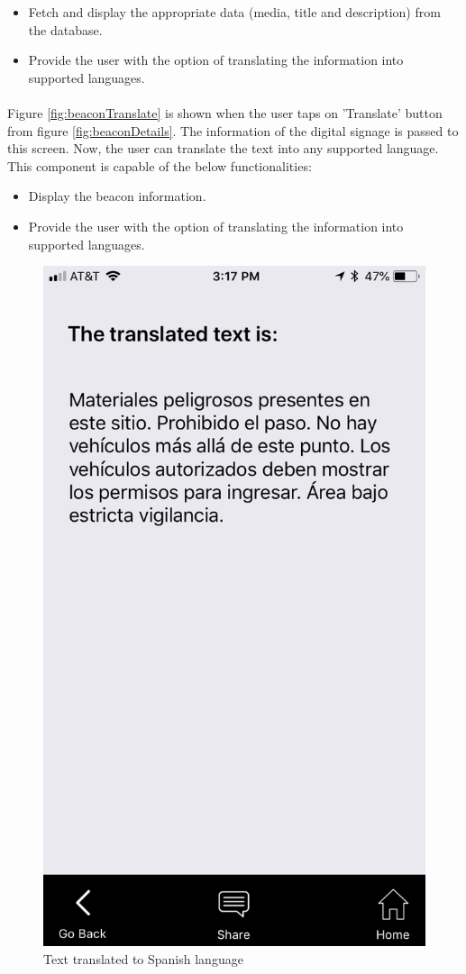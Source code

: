 \documentclass[12pt]{article}
\begin{document}
\begin{itemize}
	\item Fetch and display the appropriate data (media, title and description) from the database.
	\item Provide the user with the option of translating the information into supported languages.
\end{itemize}

\paragraph{}Figure \ref{fig:beaconTranslate} is shown when the user taps on 'Translate' button from figure \ref{fig:beaconDetails}. The information of the digital signage is passed to this screen. Now, the user can translate the text into any supported language. This component is capable of the below functionalities:

\begin{itemize}
	\item Display the beacon information.
	\item Provide the user with the option of translating the information into supported languages.
\end{itemize}


\begin{figure}[H]
	\centering
	\includegraphics[width=0.5\linewidth]{media/beacon3.PNG}
	\caption{Text translated to Spanish language}
	\label{fig:beaconSpanish}
\end{figure} 
\end{document}
